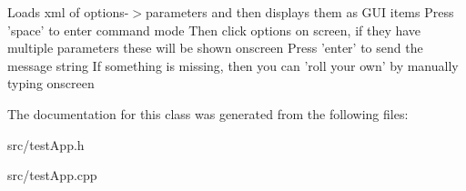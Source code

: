 Loads xml of options-\/$>$parameters and then displays them as GUI items Press 'space' to enter command mode Then click options on screen, if they have multiple parameters these will be shown onscreen Press 'enter' to send the message string If something is missing, then you can 'roll your own' by manually typing onscreen 

The documentation for this class was generated from the following files:\begin{DoxyCompactItemize}
\item 
src/testApp.h\item 
src/testApp.cpp\end{DoxyCompactItemize}
